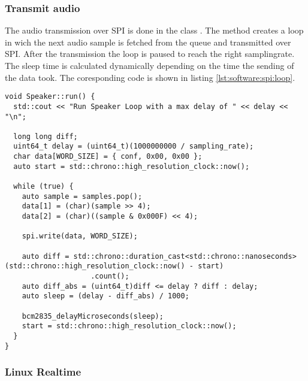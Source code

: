 \subsubsection*{Transmit audio}

The audio transmission over SPI is done in the class . The method  creates a loop in wich the next audio sample is fetched from the  queue and transmitted over SPI. After the transmission the loop is paused to reach the right samplingrate. The sleep time is calculated dynamically depending on the time the sending of the data took. The coresponding code is shown in listing \ref{lst:software:spi:loop}.
%
\begin{mdframed}
\begin{lstlisting}[caption=Audio transmission loop, label=lst:software:spi:loop]
void Speaker::run() {
  std::cout << "Run Speaker Loop with a max delay of " << delay << "\n";

  long long diff;
  uint64_t delay = (uint64_t)(1000000000 / sampling_rate);
  char data[WORD_SIZE] = { conf, 0x00, 0x00 };
  auto start = std::chrono::high_resolution_clock::now();

  while (true) {
    auto sample = samples.pop();
    data[1] = (char)(sample >> 4);
    data[2] = (char)((sample & 0x000F) << 4);

    spi.write(data, WORD_SIZE);

    auto diff = std::chrono::duration_cast<std::chrono::nanoseconds>(std::chrono::high_resolution_clock::now() - start)
                    .count();
    auto diff_abs = (uint64_t)diff <= delay ? diff : delay;
    auto sleep = (delay - diff_abs) / 1000;

    bcm2835_delayMicroseconds(sleep);
    start = std::chrono::high_resolution_clock::now();
  }
}
\end{lstlisting}
\end{mdframed}
%

\subsubsection*{Linux Realtime}


